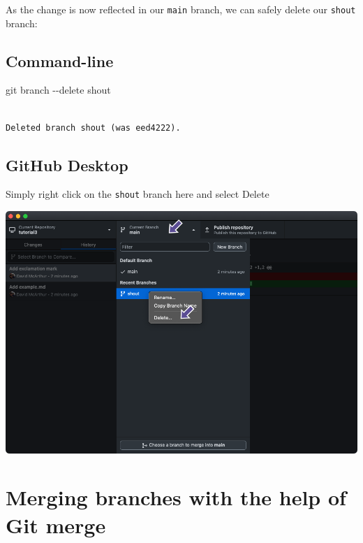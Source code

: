 \documentclass[
  letterpaper,
  DIV=11,
  numbers=noendperiod]{scrartcl}
\newenvironment{Shaded}{\begin{snugshade}}{\end{snugshade}}
\newcommand{\AttributeTok}[1]{\textcolor[rgb]{0.40,0.45,0.13}{#1}}
\newcommand{\FunctionTok}[1]{\textcolor[rgb]{0.28,0.35,0.67}{#1}}
\newcommand{\NormalTok}[1]{\textcolor[rgb]{0.00,0.23,0.31}{#1}}
\begin{document}
As the change is now reflected in our \texttt{main} branch, we can
safely delete our \texttt{shout} branch:

\subsection{Command-line}

\begin{Shaded}
\begin{Highlighting}[]
\FunctionTok{git}\NormalTok{ branch }\AttributeTok{{-}{-}delete}\NormalTok{ shout}
\end{Highlighting}
\end{Shaded}

\begin{verbatim}

Deleted branch shout (was eed4222).
\end{verbatim}

\subsection{GitHub Desktop}

Simply right click on the \texttt{shout} branch here and select Delete

\includegraphics{images/image36.png}

\hypertarget{merging-branches-with-the-help-of-git-merge}{%
\section{Merging branches with the help of Git
merge}\label{merging-branches-with-the-help-of-git-merge}}
\end{document}
